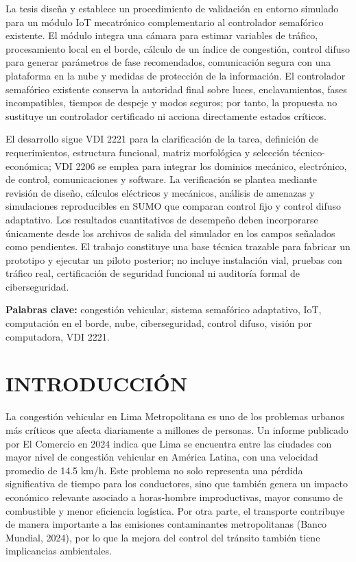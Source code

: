 \documentclass[12pt,a4paper,oneside]{report}
\begin{document}
La tesis diseña y establece un procedimiento de validación en entorno simulado para un módulo IoT mecatrónico complementario al controlador semafórico existente. El módulo integra una cámara para estimar variables de tráfico, procesamiento local en el borde, cálculo de un índice de congestión, control difuso para generar parámetros de fase recomendados, comunicación segura con una plataforma en la nube y medidas de protección de la información. El controlador semafórico existente conserva la autoridad final sobre luces, enclavamientos, fases incompatibles, tiempos de despeje y modos seguros; por tanto, la propuesta no sustituye un controlador certificado ni acciona directamente estados críticos.

El desarrollo sigue VDI 2221 para la clarificación de la tarea, definición de requerimientos, estructura funcional, matriz morfológica y selección técnico-económica; VDI 2206 se emplea para integrar los dominios mecánico, electrónico, de control, comunicaciones y software. La verificación se plantea mediante revisión de diseño, cálculos eléctricos y mecánicos, análisis de amenazas y simulaciones reproducibles en SUMO que comparan control fijo y control difuso adaptativo. Los resultados cuantitativos de desempeño deben incorporarse únicamente desde los archivos de salida del simulador en los campos señalados como pendientes. El trabajo constituye una base técnica trazable para fabricar un prototipo y ejecutar un piloto posterior; no incluye instalación vial, pruebas con tráfico real, certificación de seguridad funcional ni auditoría formal de ciberseguridad.

\textbf{Palabras clave:} congestión vehicular, sistema semafórico adaptativo, IoT, computación en el borde, nube, ciberseguridad, control difuso, visión por computadora, VDI 2221.

\cleardoublepage
{}
\tableofcontents
\cleardoublepage
{}
\listoffigures
\cleardoublepage
{}
\listoftables
\cleardoublepage
{}
\chapter*{INTRODUCCIÓN}\label{introducciuxf3n}

La congestión vehicular en Lima Metropolitana es uno de los problemas urbanos más críticos que afecta diariamente a millones de personas. Un informe publicado por El Comercio en 2024 indica que Lima se encuentra entre las ciudades con mayor nivel de congestión vehicular en América Latina, con una velocidad promedio de 14.5 km/h. Este problema no solo representa una pérdida significativa de tiempo para los conductores, sino que también genera un impacto económico relevante asociado a horas-hombre improductivas, mayor consumo de combustible y menor eficiencia logística. Por otra parte, el transporte contribuye de manera importante a las emisiones contaminantes metropolitanas (Banco Mundial, 2024), por lo que la mejora del control del tránsito también tiene implicancias ambientales.
\end{document}
